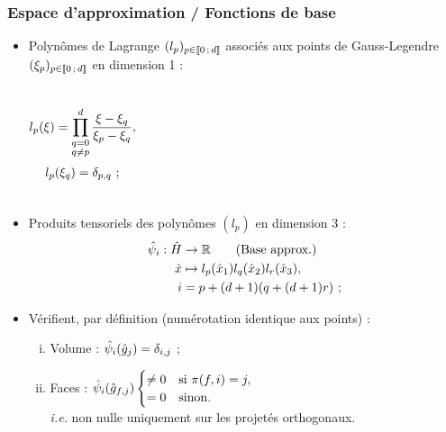 \begin{frame}
\frametitle{Espace d'approximation / Fonctions de base}
\vfill
\begin{itemize}
\item Polynômes de Lagrange $(l_p)_{p \in \lbrack\!\lbrack0\,;\,d\rbrack\!\rbrack}$
associés aux points de Gauss-Legendre $(\xi_p)_{p \in \lbrack\!\lbrack0\,;\,d\rbrack\!\rbrack}$ en dimension 1 :
\begin{columns}[c]
\begin{align*}
	l_p(\xi) = \prod_{\substack{q=0 \\ q \ne p}}^{d}
	\frac{\xi - \xi_q}{\xi_p - \xi_q} ,
\end{align*}
\begin{align*}
l_p(\xi_q) = \delta_{p,q} \ ;
\end{align*}
\end{columns}
\item Produits tensoriels des polynômes $(l_p)$ en dimension 3 :
\begin{align*}
	\hat{\psi}_{i} : \hat{H} &\to \mathbb{R}
	\tag{Base approx.} \\
	\hat{x} &\mapsto
	l_p(\hat{x}_1)
	l_q(\hat{x}_2)
	l_r(\hat{x}_3) , \\
	i &= p + (d + 1)(q + (d + 1) r) \ ;
\end{align*}
\item Vérifient, par définition (numérotation identique aux points) :
\begin{enumerate}[(i)]
\item Volume : $\hat{\psi}_{i}(\hat{g}_{j}) = \delta_{i,j}$ ;
\item Faces : $\hat{\psi}_{i}(\hat{g}_{f,j})
	\begin{cases}
	\ne 0 & \mathrm{si} \ \pi(f,i) = j , \\ 
	= 0 & \mathrm{sinon} .
	\end{cases}$\\
	\textit{i.e.} non nulle uniquement sur les projetés orthogonaux.
\end{enumerate}
\end{itemize}
\vfill
\end{frame}

